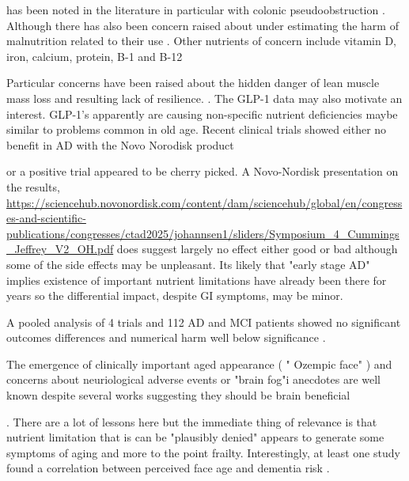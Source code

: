 
has been noted in the literature in particular with
colonic pseudoobstruction
\cite{Doshi_Escudero_Okojie_S4128Side_Effects_2025}.
Although there has also been concern raised
about under estimating the harm of malnutrition related
to their use
\cite{Fallows_Malnutrition_with_2025}.
Other nutrients of concern include vitamin D, iron, calcium,
protein, B-1 and B-12
\cite{Urbina_SalinasRuiz_Valenciano_Micronutrient_Nutritional_Deficiencies_2026}

Particular concerns have been raised about the hidden danger of
lean muscle mass loss and resulting lack of resilience.
\cite{Tippairote2025}.
The GLP-1 data may also motivate an interest. GLP-1's apparently
are causing non-specific nutrient deficiencies maybe similar to
problems common in old age. Recent clinical trials showed either no
benefit in AD  with the Novo Norodisk product
\cite{xxx_Popular_obesity_drug_fails_2025}


or a positive trial
\cite{Edison_Femminella_Ritchie_Liraglutide_mild_2025}
 appeared to be cherry picked.
A Novo-Nordisk presentation on the results, 
{\url{https://sciencehub.novonordisk.com/content/dam/sciencehub/global/en/congresses-and-scientific-publications/congresses/ctad2025/johannsen1/sliders/Symposium_4_Cummings_Jeffrey_V2_OH.pdf}}
does suggest largely no effect either good or bad
although some of the side effects may be unpleasant.
Its likely that "early stage AD" implies existence of important
nutrient limitations have already been there for years so 
the differential impact, despite GI symptoms, may be minor. 

A pooled analysis of 4 trials and 112 AD and MCI patients showed
no significant outcomes differences and numerical 
harm well below significance \cite{OMara2026}.

The emergence of clinically 
important aged appearance ( " Ozempic face" )
\cite{Neto_Esper_Ux201c_char_2025}
\cite{Salam_Hyder_Semaglutide_skin_2025}
and  concerns about neuriological adverse events
\cite{Chen_Liu_Gao_Pharmacovigilance_analysis_neurological_2025}
or "brain fog"i anecdotes
\cite{team_Semaglutide_Mental_Side_Effects_2026}
 are well known
despite several works suggesting they should be
brain beneficial

. There are a lot of lessons here but the
immediate thing of relevance is that nutrient limitation that
is can be "plausibly denied" appears to generate some symptoms
of aging and more to the point frailty. Interestingly, at least one
study found a correlation between perceived face age and dementia
risk 
\cite{Xu2024}.


